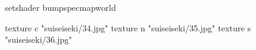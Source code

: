 setshader bumpspecmapworld

    texture c "suiseiseki/34.jpg"
    texture n "suiseiseki/35.jpg"
    texture s "suiseiseki/36.jpg"
